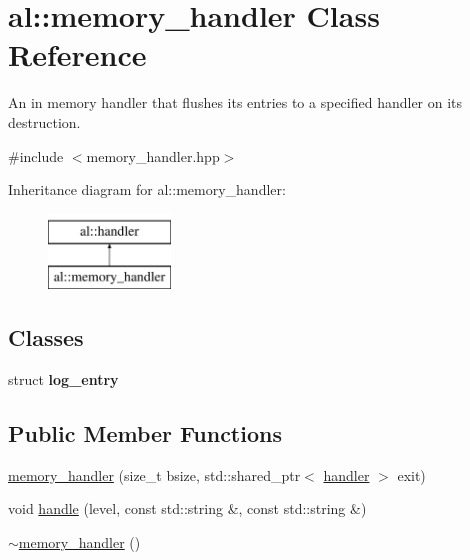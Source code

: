 \hypertarget{classal_1_1memory__handler}{\section{al\-:\-:memory\-\_\-handler \-Class \-Reference}
\label{classal_1_1memory__handler}
}


\-An in memory handler that flushes its entries to a specified handler on its destruction.  




{\ttfamily \#include $<$memory\-\_\-handler.\-hpp$>$}

\-Inheritance diagram for al\-:\-:memory\-\_\-handler\-:\begin{figure}[H]
\begin{center}
\leavevmode
\includegraphics[height=2.000000cm]{classal_1_1memory__handler}
\end{center}
\end{figure}
\subsection*{\-Classes}
\begin{DoxyCompactItemize}
\item 
struct {\bfseries log\-\_\-entry}
\end{DoxyCompactItemize}
\subsection*{\-Public \-Member \-Functions}
\begin{DoxyCompactItemize}
\item 
\hyperlink{classal_1_1memory__handler_a74331eb896c73e46e9d8da1ab8443b32}{memory\-\_\-handler} (size\-\_\-t bsize, std\-::shared\-\_\-ptr$<$ \hyperlink{classal_1_1handler}{handler} $>$ exit)
\item 
void \hyperlink{classal_1_1memory__handler_ac7d78c5cee952f2934b12e26f4f271eb}{handle} (level, const std\-::string \&, const std\-::string \&)
\item 
\hyperlink{classal_1_1memory__handler_a09887d99cbdaea2db862a92b9d1edd7c}{$\sim$memory\-\_\-handler} ()
\end{DoxyCompactItemize}


